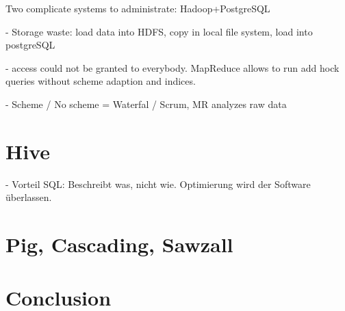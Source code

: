 \documentclass[12pt,a4paper]{scrartcl}		%
\begin{document}
Two complicate systems to administrate: Hadoop+PostgreSQL

  - Storage waste:
    load data into HDFS, copy in local file system, load into postgreSQL

- access could not be granted to everybody. MapReduce allows to run add hock queries without scheme adaption and indices.

- Scheme / No scheme = Waterfal / Scrum, MR analyzes raw data


\section{Hive}

- Vorteil SQL: Beschreibt was, nicht wie. Optimierung wird der Software überlassen.
\section{Pig, Cascading, Sawzall}

\section{Conclusion}



{}

\end{document}
